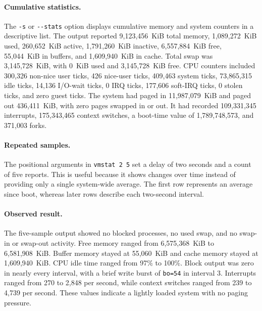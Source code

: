 
\paragraph{Cumulative statistics.}
The \texttt{-s} or \texttt{-{}-stats} option displays cumulative memory and system
counters in a descriptive list. The output reported 9,123,456~KiB total memory,
1,089,272~KiB used, 260,652~KiB active, 1,791,260~KiB inactive, 6,557,884~KiB free,
55,044~KiB in buffers, and 1,609,940~KiB in cache. Total swap was
3,145,728~KiB, with 0~KiB used and 3,145,728~KiB free. CPU counters included
300,326 non-nice user ticks, 426 nice-user ticks, 409,463 system ticks,
73,865,315 idle ticks, 14,136 I/O-wait ticks, 0 IRQ ticks, 177,606 soft-IRQ ticks,
0 stolen ticks, and zero guest ticks. The system had paged in 11,987,079~KiB and
paged out 436,411~KiB, with zero pages swapped in or out. It had recorded
109,331,345 interrupts, 175,343,465 context switches, a boot-time value of
1,789,748,573, and 371,003 forks.

\paragraph{Repeated samples.}
The positional arguments in \texttt{vmstat 2 5} set a delay of two seconds and
a count of five reports. This is useful because it shows changes over time
instead of providing only a single system-wide average. The first row represents
an average since boot, whereas later rows describe each two-second interval.

\paragraph{Observed result.}
The five-sample output showed no blocked processes, no used swap, and no
swap-in or swap-out activity. Free memory ranged from 6,575,368~KiB to
6,581,908~KiB. Buffer memory stayed at 55,060~KiB and cache memory stayed at
1,609,940~KiB. CPU idle time ranged from 97\% to 100\%. Block output was zero
in nearly every interval, with a brief write burst of \texttt{bo=54} in interval
3. Interrupts ranged from 270 to 2,848 per second, while context switches
ranged from 239 to 4,739 per second. These values indicate a lightly loaded
system with no paging pressure.
